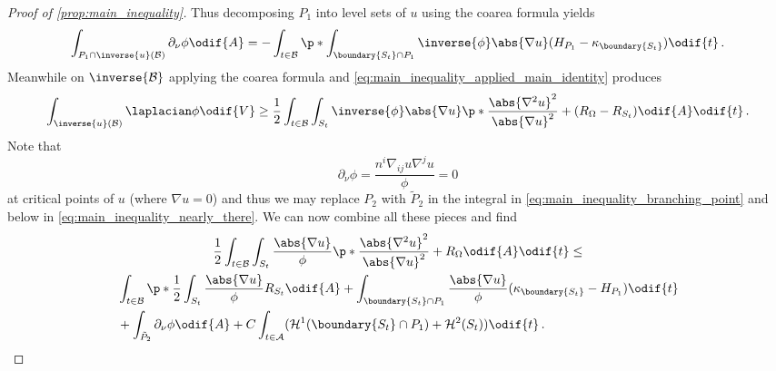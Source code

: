 \documentclass[titlepage,numbers=noenddot,oneside,%
cleardoublepage=empty,paper=a4,fontsize=11pt,%
english,%
]{scrartcl}
\newcommand*{\mathfullstop}{\,.}
\begin{document}
{\begin{proof}[Proof of \cref{prop:main_inequality}]
    Thus decomposing \( P_1 \) into level sets of \( u \) using the coarea formula yields 
    \begin{equation*}
        \int_{P_1\cap \inverse{u}(\mathcal{B})}\partial_{\nu}\phi\odif{A}=-\int_{t\in \mathcal{B}}\p*{\int_{\boundary{S_t}\cap P_1}\inverse{\phi}\abs{\nabla u}(H_{P_1}-\kappa_{\boundary{S_t}})}\odif{t}\mathfullstop
    \end{equation*}
    Meanwhile on \( \inverse{\mathcal{B}} \) applying the coarea formula and \cref{eq:main_inequality_applied_main_identity} produces
    \begin{equation*}
        \int_{\inverse{u}(\mathcal{B})}\laplacian\phi\odif{V}\geq \frac{1}{2}\int_{t\in \mathcal{B}}\int_{S_t}\inverse{\phi}\abs{\nabla u}\p*{\frac{\abs{\nabla^2 u}^2}{\abs{\nabla u}^2}+(R_{\Omega}-R_{S_t})}\odif{A}\odif{t}\mathfullstop
    \end{equation*}
    Note that 
    \begin{equation*}
        \partial_\nu \phi=\frac{n^i \nabla_{ij}u \nabla^j u}{\phi}=0
    \end{equation*} 
    at critical points of \( u \) (where \( \nabla u=0 \)) and thus we may replace \( P_2 \) with \( \tilde{P}_2 \) in the integral in \cref{eq:main_inequality_branching_point} and below in \cref{eq:main_inequality_nearly_there}. We can now combine all these pieces and find
    \begin{multline}\label{eq:main_inequality_nearly_there}
        \frac{1}{2}\int_{t\in \mathcal{B}}\int_{S_t}\frac{\abs{\nabla u}}{\phi}\p*{\frac{\abs{\nabla^2 u}^2}{\abs{\nabla u}^2}+R_{\Omega}}\odif{A}\odif{t}\leq\\
         \begin{aligned}[t]
            &\int_{t\in \mathcal{B}}\p*{\frac{1}{2}\int_{S_t}\frac{\abs{\nabla u}}{\phi}R_{S_t}\odif{A}+\int_{\boundary{S_t}\cap P_1}\frac{\abs{\nabla u}}{\phi}(\kappa_{\boundary{S_t}}-H_{P_1})} \odif{t}  \\
            &+\int_{\tilde{P}_2}\partial_{\nu}\phi\odif{A}+C\int_{t\in \mathcal{A}}(\mathcal{H}^1(\boundary{S_t}\cap P_1)+\mathcal{H}^2(S_t))\odif{t}\mathfullstop
         \end{aligned}
    \end{multline}
    

\end{proof}}
\end{document}
